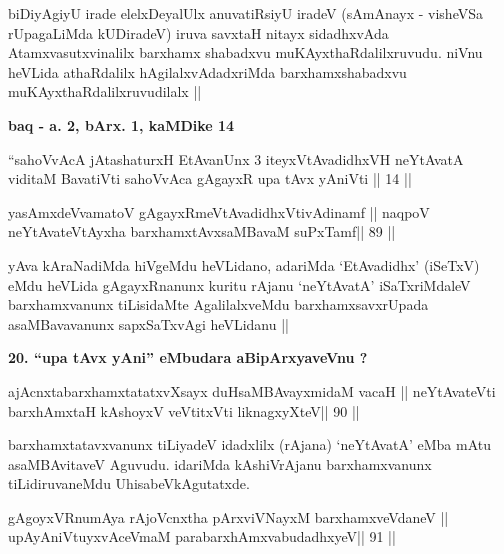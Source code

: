 \begin{artha}
biDiyAgiyU irade elelxDeyalUlx anuvatiRsiyU iradeV (sAmAnayx - visheVSa rUpagaLiMda kUDiradeV) iruva savxtaH nitayx sidadhxvAda Atamxvasutxvinalilx barxhamx shabadxvu muKAyxthaRdalilxruvudu. niVnu heVLida athaRdalilx hAgilalxvAdadxriMda barxhamxshabadxvu muKAyxthaRdalilxruvudilalx ||
\end{artha} 

\begin{center}
{\large\textbf{baq - a. 2, bArx. 1, kaMDike 14}}
\end{center}

\begin{shl}
``sahoVvAcA jAtashaturxH EtAvanUnx 3 iteyxVtAvadidhxVH
neYtAvatA viditaM BavatiVti sahoVvAca gAgayxR
upa tAvx yAniVti || 14 ||
\end{shl}

\begin{shl}
yasAmxdeVvamatoV gAgayxRmeVtAvadidhxVtivAdinamf ||
naqpoV neYtAvateVtAyxha barxhamxtAvxsaMBavaM suPxTamf\hfill || 89 ||
\end{shl}

\begin{artha}
yAva kAraNadiMda hiVgeMdu heVLidano, adariMda `EtAvadidhx' (iSeTxV) eMdu heVLida gAgayxRnanunx kuritu rAjanu `neYtAvatA' iSaTxriMdaleV barxhamxvanunx tiLisidaMte AgalilalxveMdu barxhamxsavxrUpada asaMBavavanunx sapxSaTxvAgi heVLidanu ||
\end{artha}

\begin{artha}
{\bf 20. ``upa tAvx yAni'' eMbudara aBipArxyaveVnu ?}
\end{artha} 

\begin{shl}
ajAcnxtabarxhamxtatatxvXsayx duHsaMBAvayxmidaM vacaH ||
neYtAvateVti barxhAmxtaH kAshoyxV veVtitxVti liknagxyXteV\hfill || 90 ||
\end{shl}

\begin{artha}
barxhamxtatavxvanunx tiLiyadeV idadxlilx (rAjana) `neYtAvatA' eMba mAtu  asaMBAvitaveV Aguvudu. idariMda kAshiVrAjanu barxhamxvanunx tiLidiruvaneMdu UhisabeVkAgutatxde.
\end{artha}

\begin{shl}
gAgoyxVR\s numAya rAjoVcnx\s tha pArxviVNayxM barxhamxveVdaneV ||
upAyAniVtuyxvAceVmaM parabarxhAmxvabudadhxyeV\hfill || 91 ||
\end{shl}

